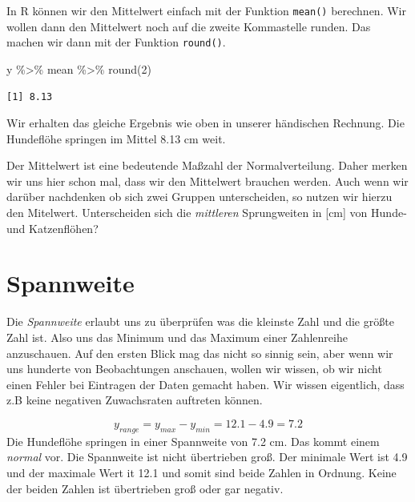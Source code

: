 \documentclass[
  letterpaper,
  DIV=11,
  oneside]{scrreport}
\newenvironment{Shaded}{\begin{snugshade}}{\end{snugshade}}
\newcommand{\DecValTok}[1]{\textcolor[rgb]{0.68,0.00,0.00}{#1}}
\newcommand{\FunctionTok}[1]{\textcolor[rgb]{0.28,0.35,0.67}{#1}}
\newcommand{\NormalTok}[1]{\textcolor[rgb]{0.00,0.23,0.31}{#1}}
\newcommand{\SpecialCharTok}[1]{\textcolor[rgb]{0.37,0.37,0.37}{#1}}
\begin{document}
In R können wir den Mittelwert einfach mit der Funktion \texttt{mean()}
berechnen. Wir wollen dann den Mittelwert noch auf die zweite
Kommastelle runden. Das machen wir dann mit der Funktion
\texttt{round()}.

\begin{Shaded}
\begin{Highlighting}[]
\NormalTok{y }\SpecialCharTok{\%\textgreater{}\%}\NormalTok{ mean }\SpecialCharTok{\%\textgreater{}\%} \FunctionTok{round}\NormalTok{(}\DecValTok{2}\NormalTok{)}
\end{Highlighting}
\end{Shaded}

\begin{verbatim}
[1] 8.13
\end{verbatim}

Wir erhalten das gleiche Ergebnis wie oben in unserer händischen
Rechnung. Die Hundeflöhe springen im Mittel 8.13 cm weit.

Der Mittelwert ist eine bedeutende Maßzahl der Normalverteilung. Daher
merken wir uns hier schon mal, dass wir den Mittelwert brauchen werden.
Auch wenn wir darüber nachdenken ob sich zwei Gruppen unterscheiden, so
nutzen wir hierzu den Mitelwert. Unterscheiden sich die \emph{mittleren}
Sprungweiten in {[}cm{]} von Hunde- und Katzenflöhen?

\hypertarget{spannweite}{%
\section{Spannweite}\label{spannweite}}

Die \emph{Spannweite} erlaubt uns zu überprüfen was die kleinste Zahl
und die größte Zahl ist. Also uns das Minimum und das Maximum einer
Zahlenreihe anzuschauen. Auf den ersten Blick mag das nicht so sinnig
sein, aber wenn wir uns hunderte von Beobachtungen anschauen, wollen wir
wissen, ob wir nicht einen Fehler bei Eintragen der Daten gemacht haben.
Wir wissen eigentlich, dass z.B keine negativen Zuwachsraten auftreten
können.

{}

\[
y_{range} = y_{max} - y_{min} = 12.1 - 4.9 = 7.2
\] Die Hundeflöhe springen in einer Spannweite von 7.2 cm. Das kommt
einem \emph{normal} vor. Die Spannweite ist nicht übertrieben groß. Der
minimale Wert ist 4.9 und der maximale Wert it 12.1 und somit sind beide
Zahlen in Ordnung. Keine der beiden Zahlen ist übertrieben groß oder gar
negativ.
\end{document}
